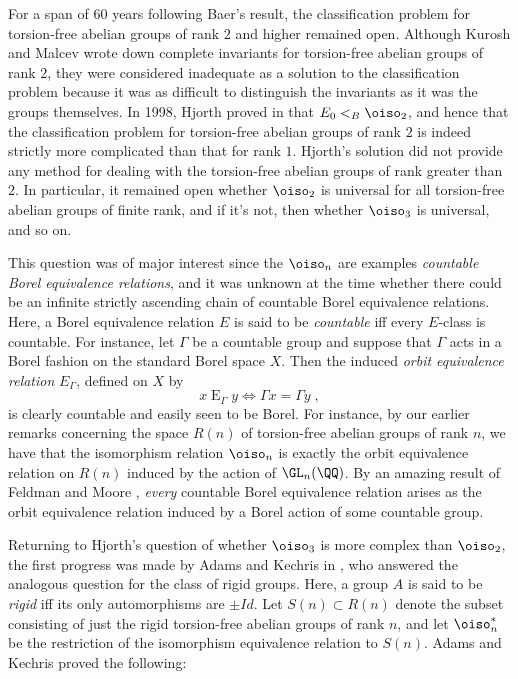 \documentclass[oneside,leqno,11pt]{amsart}
\begin{document}
For a span of 60 years following Baer's result, the classification
problem for torsion-free abelian groups of rank $2$ and higher
remained open.  Although Kurosh and Malcev wrote down complete
invariants for torsion-free abelian groups of rank $2$, they were
considered inadequate as a solution to the classification problem
because it was as difficult to distinguish the invariants as it was
the groups themselves.  In 1998, Hjorth proved in \cite{hjorth} that
$E_0<_B\oiso_2$, and hence that the classification problem for
torsion-free abelian groups of rank $2$ is indeed strictly more
complicated than that for rank $1$.  Hjorth's solution did not provide
any method for dealing with the torsion-free abelian groups of rank
greater than $2$.  In particular, it remained open whether $\oiso_2$
is universal for all torsion-free abelian groups of finite rank, and
if it's not, then whether $\oiso_3$ is universal, and so on.

This question was of major interest since the $\oiso_n$ are examples
\emph{countable Borel equivalence relations}, and it was unknown at
the time whether there could be an infinite strictly ascending chain
of countable Borel equivalence relations.  Here, a Borel equivalence
relation $E$ is said to be \emph{countable} iff every $E$-class is
countable.  For instance, let $\Gamma$ be a countable group and
suppose that $\Gamma$ acts in a Borel fashion on the standard Borel
space $X$.  Then the induced \emph{orbit equivalence relation}
$E_\Gamma$, defined on $X$ by
\[x\mathrel{E}_\Gamma y\iff\Gamma x=\Gamma y\;,
\]
is clearly countable and easily seen to be Borel.  For instance, by
our earlier remarks concerning the space $R(n)$ of torsion-free
abelian groups of rank $n$, we have that the isomorphism relation
$\oiso_n$ is exactly the orbit equivalence relation on $R(n)$ induced
by the action of $\GL_n(\QQ)$.  By an amazing result of Feldman and
Moore \cite{feldmanmoore}, \emph{every} countable Borel equivalence
relation arises as the orbit equivalence relation induced by a Borel
action of some countable group.

Returning to Hjorth's question of whether $\oiso_3$ is more complex
than $\oiso_2$, the first progress was made by Adams and Kechris in
\cite{adamskechris}, who answered the analogous question for the class
of rigid groups.  Here, a group $A$ is said to be \emph{rigid} iff its
only automorphisms are $\pm Id$.  Let $S(n)\subset R(n)$ denote the
subset consisting of just the rigid torsion-free abelian groups of
rank $n$, and let $\oiso_n^*$ be the restriction of the isomorphism
equivalence relation to $S(n)$.  Adams and Kechris proved the
following:
\end{document}
